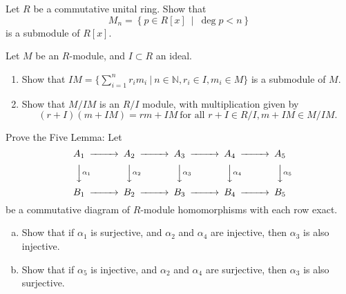 \documentclass{problemset}
\begin{document}
\begin{exercise} Let \(R\) be a commutative unital ring.  Show that \[M_n = \left\{ p \in R[x]\ \middle|\ \deg p < n \right\}\] is a submodule of \(R[x]\).
\end{exercise}


\begin{exercise} Let \(M\) be an \(R\)-module, and \(I \subset R\) an ideal. 
\begin{enumerate}
\item Show that \(IM = \{ \sum _{i=1} ^n r_i m_i\ |\ n \in \mathbb{N}, r_i \in I, m_i \in M\}\) is a submodule of \(M\).
\item Show that \(M/IM\) is an \(R/I\) module, with multiplication given by \[(r+I)(m+IM)=rm+IM\ \text{for all }r +I\in R/I, m+IM \in M/IM.\]
\end{enumerate}
\end{exercise}


\begin{exercise} Prove the Five Lemma: Let
\[\begin{CD}
A_1 @>>> A_2 @>>> A_3 @>>> A_4 @>>> A_5\\
@VV\alpha _1V @VV\alpha _2V @VV\alpha _3V @VV\alpha _4V @VV\alpha _5V \\
B_1 @>>> B_2 @>>> B_3 @>>> B_4 @>>> B_5\\
\end{CD}\]
be a commutative diagram of \(R\)-module homomorphisms with each row exact.
\begin{enumerate}[(a)]
\item Show that if \(\alpha _1\) is surjective, and \(\alpha _2\) and \(\alpha _4\) are injective, then \(\alpha _3\) is also injective.
\item Show that if \(\alpha _5\) is injective, and \(\alpha _2\) and \(\alpha _4\) are surjective, then \(\alpha _3\) is also surjective.
\end{enumerate}
\end{exercise}

\end{document}
